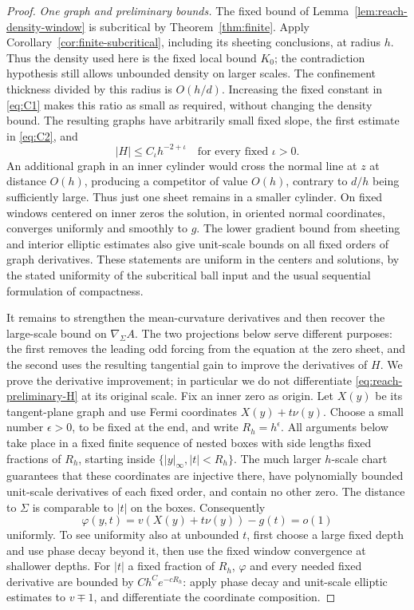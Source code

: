 \begin{proof}
\emph{One graph and preliminary bounds.}
The fixed bound of Lemma~\ref{lem:reach-density-window} is subcritical
by Theorem~\ref{thm:finite}.  Apply
Corollary~\ref{cor:finite-subcritical}, including its sheeting conclusions,
at radius $h$.  Thus the density used here is the fixed local bound
$K_0$; the contradiction hypothesis still allows unbounded density on
larger scales.
The confinement thickness divided by this radius is $O(h/d)$.
Increasing the fixed constant in \eqref{eq:C1} makes this ratio as
small as required, without changing the density bound.  The resulting
graphs have arbitrarily small fixed slope, the first estimate in
\eqref{eq:C2}, and
\begin{equation}\label{eq:reach-preliminary-H}
 |H|\le C_\iota h^{-2+\iota}\quad\text{for every fixed }\iota>0.
\end{equation}
An additional graph in an inner cylinder would cross the normal line
at $z$ at distance $O(h)$, producing a competitor of value $O(h)$,
contrary to $d/h$ being sufficiently large.  Thus just one sheet
remains in a smaller cylinder.  On fixed windows centered on inner
zeros the solution, in oriented normal coordinates, converges
uniformly and smoothly to $g$.  The lower gradient bound from sheeting
and interior elliptic estimates also give unit-scale bounds on all
fixed orders of graph derivatives.  These statements are uniform in
the centers and solutions, by the stated uniformity of the subcritical
ball input and the usual sequential formulation of compactness.

It remains to strengthen the mean-curvature derivatives and then recover
the large-scale bound on $\nabla_\Sigma A$.  The two projections below
serve different purposes: the first removes the leading odd forcing
from the equation at the zero sheet, and the second uses the resulting
tangential gain to improve the derivatives of $H$.
We prove the derivative improvement; in particular we do not
differentiate \eqref{eq:reach-preliminary-H} at its original scale.
Fix an inner zero as origin.  Let $X(y)$ be its tangent-plane graph
and use Fermi coordinates $X(y)+t\nu(y)$.  Choose a small number
$\epsilon>0$, to be fixed at the end, and write $R_h=h^\epsilon$.
All arguments below take place in a fixed finite sequence of nested
boxes with side lengths fixed fractions of $R_h$, starting inside
$\{|y|_\infty,|t|<R_h\}$.  The much larger $h$-scale chart guarantees
that these coordinates are injective there, have polynomially bounded
unit-scale derivatives of each fixed order, and contain no other
zero.  The distance to $\Sigma$ is comparable to $|t|$ on the boxes.
Consequently
\[
 \varphi(y,t)=v(X(y)+t\nu(y))-g(t)=o(1)
\]
uniformly.  To see uniformity also at unbounded $t$, first choose a
large fixed depth and use phase decay beyond it, then use the fixed
window convergence at shallower depths.  For $|t|$ a fixed fraction
of $R_h$, $\varphi$ and every needed fixed derivative are bounded by
$C h^C e^{-cR_h}$: apply phase decay and unit-scale elliptic estimates
to $v\mp1$, and differentiate the coordinate composition.


\end{proof}

